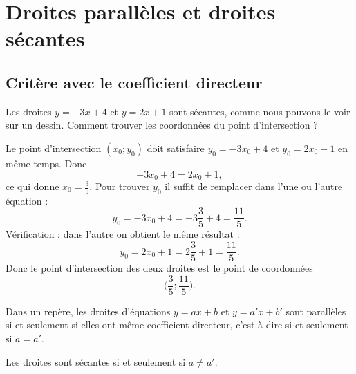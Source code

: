 

\section{Droites parallèles et droites sécantes}

\subsection{Critère avec le coefficient directeur}

\begin{example}
    Les droites \( y=-3x+4\) et \( y=2x+1\) sont sécantes, comme nous pouvons le voir sur un dessin. Comment trouver les coordonnées du point d'intersection ?

    Le point d'intersection \( (x_0;y_0)\) doit satisfaire \( y_0=-3x_0+4\) et \( y_0=2x_0+1\) en même temps. Donc
    \begin{equation}
        -3x_0+4=2x_0+1,
    \end{equation}
    ce qui donne \( x_0=\frac{ 3 }{ 5 }\). Pour trouver \( y_0\) il suffit de remplacer dans l'une ou l'autre équation :
    \begin{equation}
        y_0=-3x_0+4=-3\frac{ 3 }{ 5 }+4=\frac{ 11 }{ 5 }.
    \end{equation}
    Vérification : dans l'autre on obtient le même résultat :
    \begin{equation}
        y_0=2x_0+1=2\frac{ 3 }{ 5 }+1=\frac{ 11 }{ 5 }.
    \end{equation}
    Donc le point d'intersection des deux droites est le point de coordonnées
    \begin{equation}
        \big( \frac{ 3 }{ 5 };\frac{ 11 }{ 5 } \big).
    \end{equation}
\end{example}

\begin{theorem}
    Dans un repère, les droites d'équations \( y=ax+b\) et \( y=a'x+b'\) sont parallèles si et seulement si elles ont même coefficient directeur, c'est à dire si et seulement si \( a=a'\).

    Les droites sont sécantes si et seulement si \( a\neq a'\).
\end{theorem}

